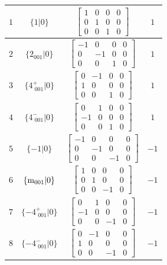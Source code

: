 \documentclass[fleqn,8pt]{jsarticle}
\begin{document}
\begin{longtable}{cccc}
$ 1 $ & $ \{1|0\} $ & $ \begin{bmatrix} 1 & 0 & 0 & 0 \\ 0 & 1 & 0 & 0 \\ 0 & 0 & 1 & 0 \end{bmatrix} $ & $ 1 $ \\ \hline
$ 2 $ & $ \{2{}_{001}|0\} $ & $ \begin{bmatrix} -1 & 0 & 0 & 0 \\ 0 & -1 & 0 & 0 \\ 0 & 0 & 1 & 0 \end{bmatrix} $ & $ 1 $ \\ \hline
$ 3 $ & $ \{4^{+}_{\,\,001}|0\} $ & $ \begin{bmatrix} 0 & -1 & 0 & 0 \\ 1 & 0 & 0 & 0 \\ 0 & 0 & 1 & 0 \end{bmatrix} $ & $ 1 $ \\ \hline
$ 4 $ & $ \{4^{-}_{\,\,001}|0\} $ & $ \begin{bmatrix} 0 & 1 & 0 & 0 \\ -1 & 0 & 0 & 0 \\ 0 & 0 & 1 & 0 \end{bmatrix} $ & $ 1 $ \\ \hline
$ 5 $ & $ \{-1|0\} $ & $ \begin{bmatrix} -1 & 0 & 0 & 0 \\ 0 & -1 & 0 & 0 \\ 0 & 0 & -1 & 0 \end{bmatrix} $ & $ -1 $ \\ \hline
$ 6 $ & $ \{{\rm m}_{001}|0\} $ & $ \begin{bmatrix} 1 & 0 & 0 & 0 \\ 0 & 1 & 0 & 0 \\ 0 & 0 & -1 & 0 \end{bmatrix} $ & $ -1 $ \\ \hline
$ 7 $ & $ \{-4^{+}_{\,\,001}|0\} $ & $ \begin{bmatrix} 0 & 1 & 0 & 0 \\ -1 & 0 & 0 & 0 \\ 0 & 0 & -1 & 0 \end{bmatrix} $ & $ -1 $ \\ \hline
$ 8 $ & $ \{-4^{-}_{\,\,001}|0\} $ & $ \begin{bmatrix} 0 & -1 & 0 & 0 \\ 1 & 0 & 0 & 0 \\ 0 & 0 & -1 & 0 \end{bmatrix} $ & $ -1 $ \\
\end{longtable}
\end{document}

